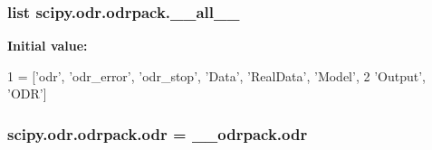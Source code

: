 \subsubsection[{\+\_\+\+\_\+all\+\_\+\+\_\+}]{\setlength{\rightskip}{0pt plus 5cm}list scipy.\+odr.\+odrpack.\+\_\+\+\_\+all\+\_\+\+\_\+}\label{namespacescipy_1_1odr_1_1odrpack_a22fc156aa61462fcc50dff98c62ce2aa}
{\bfseries Initial value\+:}
\begin{DoxyCode}
1 = [\textcolor{stringliteral}{'odr'}, \textcolor{stringliteral}{'odr\_error'}, \textcolor{stringliteral}{'odr\_stop'}, \textcolor{stringliteral}{'Data'}, \textcolor{stringliteral}{'RealData'}, \textcolor{stringliteral}{'Model'},
2            \textcolor{stringliteral}{'Output'}, \textcolor{stringliteral}{'ODR'}]
\end{DoxyCode}
\hypertarget{namespacescipy_1_1odr_1_1odrpack_abf3cc466ed8f8669da1f87e61813bc18}{}
\subsubsection[{odr}]{\setlength{\rightskip}{0pt plus 5cm}scipy.\+odr.\+odrpack.\+odr = \+\_\+\+\_\+odrpack.\+odr}\label{namespacescipy_1_1odr_1_1odrpack_abf3cc466ed8f8669da1f87e61813bc18}
